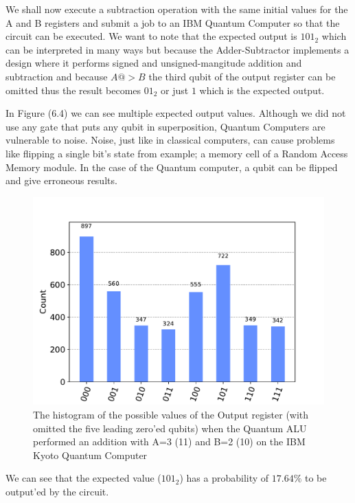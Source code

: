 We shall now execute a subtraction operation with the same initial values for the A and B registers and submit a job to an IBM Quantum Computer
so that the circuit can be executed. We want to note that the expected output is $101_2$ which can be interpreted in many ways but because
the Adder-Subtractor implements a design where it performs signed and unsigned-mangitude addition and subtraction and because $A @> B$ the
third qubit of the output register can be omitted thus the result becomes $01_2$ or just $1$ which is the expected output. 

In Figure (6.4) we can see multiple expected output values. Although we did not use any gate that puts any qubit in superposition, Quantum Computers
are vulnerable to noise. Noise, just like in classical computers, can cause problems like flipping a single bit's state from example; a memory cell
of a Random Access Memory module. In the case of the Quantum computer, a qubit can be flipped and give erroneous results.

\begin{figure}[!ht]
        \centering
        \includegraphics[scale=0.7]{images/6_Complete_System/adder_subtractor_ibmq_result.pdf}
        \caption{The histogram of the possible values of the Output register (with omitted the five leading zero'ed qubits) when the Quantum ALU performed
        an addition with A=3 (11) and B=2 (10) on the IBM Kyoto Quantum Computer}
\end{figure}

We can see that the expected value ($101_2$) has a probability of $17.64\%$ to be output'ed by the circuit.

\newpage
